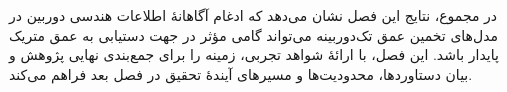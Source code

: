 در مجموع،
نتایج این فصل نشان می‌دهد که
ادغام آگاهانهٔ اطلاعات هندسی دوربین
در مدل‌های تخمین عمق تک‌دوربینه
می‌تواند گامی مؤثر
در جهت دستیابی به عمق متریک پایدار باشد.
این فصل، با ارائهٔ شواهد تجربی،
زمینه را برای جمع‌بندی نهایی پژوهش
و بیان دستاوردها، محدودیت‌ها
و مسیرهای آیندهٔ تحقیق
در فصل بعد فراهم می‌کند.
